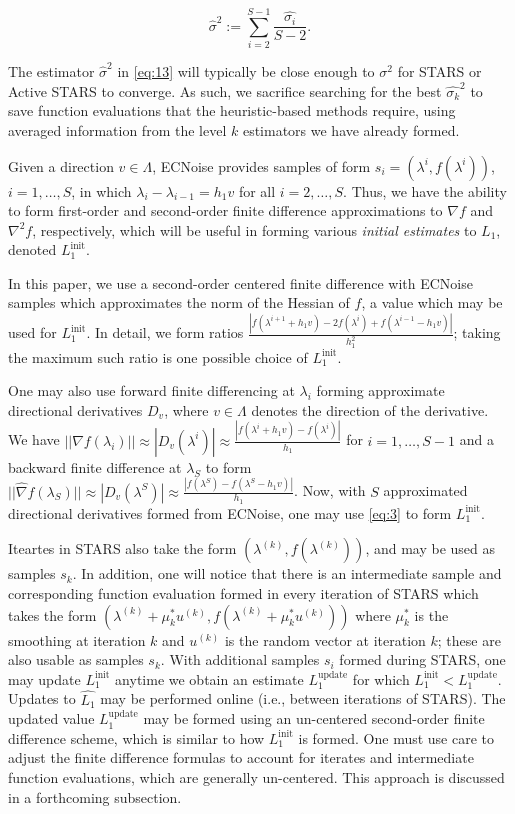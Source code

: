 \documentclass{amsart}
\begin{document}
\begin{equation} \label{eq:15}
 \hat{\sigma}^2:=\sum_{i=2}^{S-1}\frac{\hat{\sigma_i}}{S-2}.
\end{equation}  

The estimator $\hat{\sigma}^2$ in \eqref{eq:13} will typically be close enough to $\sigma^2$ for STARS or Active STARS to converge. As such, we sacrifice searching for the best $\hat{\sigma_k}^2$ to save function evaluations that the heuristic-based methods require, using averaged information from the level $k$ estimators we have already formed.

Given a direction $v \in \Lambda$, ECNoise provides samples of form $s_i=(\lambda^i, f(\lambda^i))$, $i=1,\ldots, S$, in which $\lambda_i-\lambda_{i-1}=h_1v$ for all $i=2,\ldots, S.$ Thus, we have the ability to form first-order and second-order finite difference approximations to $\nabla f$ and $\nabla^2 f$, respectively, which will be useful in forming various \textit{initial estimates} to $L_1$, denoted $L_1^\text{init}$. 

In this paper, we use a second-order centered finite difference with ECNoise samples which approximates the norm of the Hessian of $f$, a value which may be used for $L_1^\text{init}$. In detail, we form ratios $\frac{|f(\lambda^{i+1}+h_1 v)-2f(\lambda^{i})+f(\lambda^{i-1}-h_1 v)|}{h_1^2}$; taking the maximum such ratio is one possible choice of $L_1^\text{init}$.

One may also use forward finite differencing at $\lambda_i$ forming approximate directional derivatives $D_v$, where $v \in \Lambda$ denotes the direction of the derivative.  We have $||\hat{\nabla }f(\lambda_i)||\approx |D_v (\lambda^i)|\approx\frac{|f(\lambda^{i}+h_1 v)-f(\lambda^{i})|}{h_1}$ for $i=1,\ldots,S-1$ and a backward finite difference at $\lambda_S$ to form $||\hat{\nabla }f(\lambda_S)|| \approx |D_v(\lambda^S)|\approx\frac{|f(\lambda^{S})-f(\lambda^{S}-h_1 v)|}{h_1}$. Now, with $S$ approximated directional derivatives formed from ECNoise, one may use \eqref{eq:3} to form $L_1^\text{init}$.

Iteartes in STARS also take the form $(\lambda^{(k)}, f(\lambda^{(k)}))$, and may be used as samples $s_k$. In addition, one will notice that there is an intermediate sample and corresponding function evaluation formed in every iteration of STARS which takes the form $(\lambda^{(k)}+\mu^*_k u^{(k)}, f(\lambda^{(k)}+\mu^*_k u^{(k)}))$ where $\mu^*_k$ is the smoothing at iteration $k$ and $u^{(k)}$ is the random vector at iteration $k$; these are also usable as samples $s_k$. With additional samples $s_i$ formed during STARS, one may update $L_1^\text{init}$ anytime we obtain an estimate $L_1^\text{update}$ for which $L_1^\text{init}<L_1^\text{update}$. Updates to $\hat{L_1}$ may be performed online (i.e., between iterations of STARS). The updated value $L_1^\text{update}$ may be formed using an un-centered second-order finite difference scheme, which is similar to how $L_1^\text{init}$ is formed. One must use care to adjust the finite difference formulas to account for iterates and intermediate function evaluations, which are generally un-centered. This approach is discussed in a forthcoming subsection.
\end{document}
